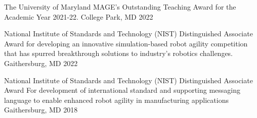 




\begin{cvhonors}


\cvhonor
{The University of Maryland} %
{\newline MAGE's Outstanding Teaching Award for the Academic Year 2021-22.} %
{College Park, MD} %
{2022} %


\end{cvhonors}



\begin{cvhonors}


\cvhonor
{National Institute of Standards and Technology (NIST)} %
{\newline Distinguished Associate Award for developing an innovative simulation-based robot agility competition that has spurred breakthrough solutions to industry's robotics challenges.} %
{Gaithersburg, MD} %
{2022} %


\end{cvhonors}





\begin{cvhonors}


\cvhonor
{National Institute of Standards and Technology (NIST)} %
{\newline Distinguished Associate Award For development of international standard and supporting messaging language to enable enhanced robot agility in manufacturing applications} %
{Gaithersburg, MD} %
{2018} %


\end{cvhonors}


